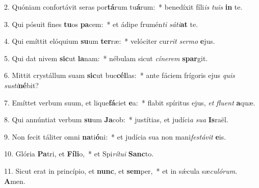 2. Quóniam confortávit seras por\textbf{tá}rum tu\textbf{á}rum:~*  benedíxit fíli\textit{is} \textit{tu}\textit{is} \textbf{in} te.\

3. Qui pósuit fines \textbf{tu}os \textbf{pa}cem:~*  et ádipe frumén\textit{ti} \textit{sá}\textit{ti}\textbf{at} te.\

4. Qui emíttit elóquium \textbf{su}um \textbf{ter}ræ:~*  velóciter cur\textit{rit} \textit{ser}\textit{mo} \textbf{e}jus.\

5. Qui dat nivem \textbf{sic}ut \textbf{la}nam:~*  nébulam sicut \textit{cí}\textit{ne}\textit{rem} \textbf{spar}git.\

6. Mittit crystállum suam \textbf{sic}ut buc\textbf{cél}las:~*  ante fáciem frígoris ejus \textit{quis} \textit{sus}\textit{ti}\textbf{né}bit?\

7. Emíttet verbum suum, et lique\textbf{fá}ciet \textbf{e}a:~*  flabit spíritus ejus, \textit{et} \textit{flu}\textit{ent} \textbf{a}quæ.\

8. Qui annúntiat verbum \textbf{su}um \textbf{Ja}cob:~*  justítias, et judíci\textit{a} \textit{su}\textit{a} \textbf{Is}raël.\

9. Non fecit táliter omni \textbf{na}ti\textbf{ó}ni:~*  et judícia sua non mani\textit{fes}\textit{tá}\textit{vit} \textbf{e}is.\

10. Glória \textbf{Pa}tri, et \textbf{Fí}\textbf{li}o,~*  et Spi\textit{rí}\textit{tu}\textit{i} \textbf{Sanc}to.\

11. Sicut erat in princípio, et \textbf{nunc}, et \textbf{sem}per,~*  et in sǽcula sæ\textit{cu}\textit{ló}\textit{rum}. \textbf{A}men.\

